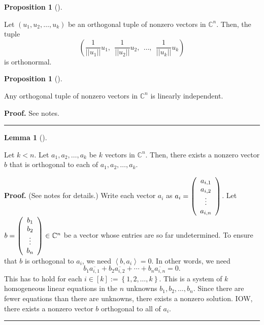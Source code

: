 \documentclass[numbers=enddot,12pt,final,onecolumn,notitlepage]{scrartcl}%
\numberwithin{exer}{subsection}
\theoremstyle{definition}
\newtheorem{lem}[theo]{Lemma}
\newenvironment{lemma}[1][]
{\begin{lem}[#1]\begin{leftbar}}
{\end{leftbar}\end{lem}}
\newtheorem{prop}[theo]{Proposition}
\newenvironment{proposition}[1][]
{\begin{prop}[#1]\begin{leftbar}}
{\end{leftbar}\end{prop}}
\newenvironment{proof}[1][Proof]{\noindent\textbf{#1.} }{\ \rule{0.5em}{0.5em}}
\begin{document}
\begin{proposition}
Let $\left(  u_{1},u_{2},\ldots,u_{k}\right)  $ be an orthogonal tuple of
nonzero vectors in $\mathbb{C}^{n}$. Then, the tuple%
\[
\left(  \dfrac{1}{\left\vert \left\vert u_{1}\right\vert \right\vert }%
u_{1},\ \ \dfrac{1}{\left\vert \left\vert u_{2}\right\vert \right\vert }%
u_{2},\ \ \ldots,\ \ \dfrac{1}{\left\vert \left\vert u_{k}\right\vert
\right\vert }u_{k}\right)
\]
is orthonormal.
\end{proposition}

\begin{proposition}
Any orthogonal tuple of nonzero vectors in $\mathbb{C}^{n}$ is linearly independent.
\end{proposition}

\begin{proof}
See notes.
\end{proof}

\begin{lemma}
Let $k<n$. Let $a_{1},a_{2},\ldots,a_{k}$ be $k$ vectors in $\mathbb{C}^{n}$.
Then, there exists a nonzero vector $b$ that is orthogonal to each of
$a_{1},a_{2},\ldots,a_{k}$.
\end{lemma}

\begin{proof}
(See notes for details.) Write each vector $a_{i}$ as $a_{i}=\left(
\begin{array}
[c]{c}%
a_{i,1}\\
a_{i,2}\\
\vdots\\
a_{i,n}%
\end{array}
\right)  $. Let $b=\left(
\begin{array}
[c]{c}%
b_{1}\\
b_{2}\\
\vdots\\
b_{n}%
\end{array}
\right)  \in\mathbb{C}^{n}$ be a vector whose entries are so far undetermined.
To ensure that $b$ is orthogonal to $a_{i}$, we need $\left\langle
b,a_{i}\right\rangle =0$. In other words, we need%
\[
b_{1}\overline{a_{i,1}}+b_{2}\overline{a_{i,2}}+\cdots+b_{n}\overline{a_{i,n}%
}=0.
\]
This has to hold for each $i\in\left[  k\right]  :=\left\{  1,2,\ldots
,k\right\}  $. This is a system of $k$ homogeneous linear equations in the $n$
unknowns $b_{1},b_{2},\ldots,b_{n}$. Since there are fewer equations than
there are unknowns, there exists a nonzero solution. IOW, there exists a
nonzero vector $b$ orthogonal to all of $a_{i}$.
\end{proof}
\end{document}
